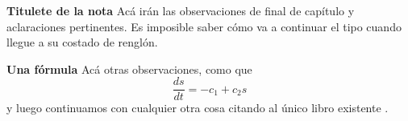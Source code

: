\documentclass[10pt,oneside]{CBFT_article}
\begin{document}
\begin{notasfinales}

\item {\bf Titulete de la nota}
Acá irán las observaciones de final de capítulo y aclaraciones 
pertinentes. 
Es imposible saber cómo va a continuar el tipo cuando llegue a su costado
de renglón.
\item {\bf Una fórmula}
Acá otras observaciones, como que
\[
\frac{ds}{dt}=-c_1+c_2s
\]
y luego continuamos con cualquier otra cosa citando al único libro existente \citep{Brekho}.
\lipsum[19]
\end{notasfinales}



\end{document}
